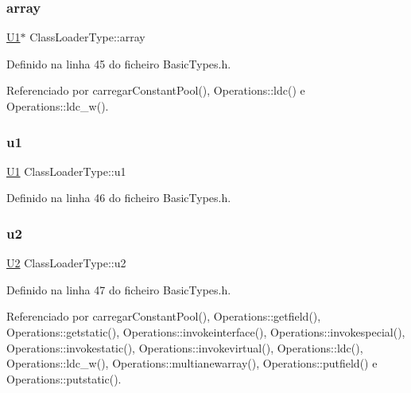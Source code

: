\subsubsection{\texorpdfstring{array}{array}}
{\footnotesize\ttfamily \hyperlink{BasicTypes_8h_a9bffe5bb2564f91cd90fb7d06848f9a8}{U1}$\ast$ Class\+Loader\+Type\+::array}



Definido na linha 45 do ficheiro Basic\+Types.\+h.



Referenciado por carregar\+Constant\+Pool(), Operations\+::ldc() e Operations\+::ldc\+\_\+w().

\mbox{\label{unionClassLoaderType_ac3612ba54bfba5c4b856dcba8db1a8a8}} 
\subsubsection{\texorpdfstring{u1}{u1}}
{\footnotesize\ttfamily \hyperlink{BasicTypes_8h_a9bffe5bb2564f91cd90fb7d06848f9a8}{U1} Class\+Loader\+Type\+::u1}



Definido na linha 46 do ficheiro Basic\+Types.\+h.

\mbox{\label{unionClassLoaderType_aaf24600dbc4afe99210fa000bdb1e6d7}} 
\subsubsection{\texorpdfstring{u2}{u2}}
{\footnotesize\ttfamily \hyperlink{BasicTypes_8h_a90240657108b1b457eef9d3f76e0202e}{U2} Class\+Loader\+Type\+::u2}



Definido na linha 47 do ficheiro Basic\+Types.\+h.



Referenciado por carregar\+Constant\+Pool(), Operations\+::getfield(), Operations\+::getstatic(), Operations\+::invokeinterface(), Operations\+::invokespecial(), Operations\+::invokestatic(), Operations\+::invokevirtual(), Operations\+::ldc(), Operations\+::ldc\+\_\+w(), Operations\+::multianewarray(), Operations\+::putfield() e Operations\+::putstatic().

